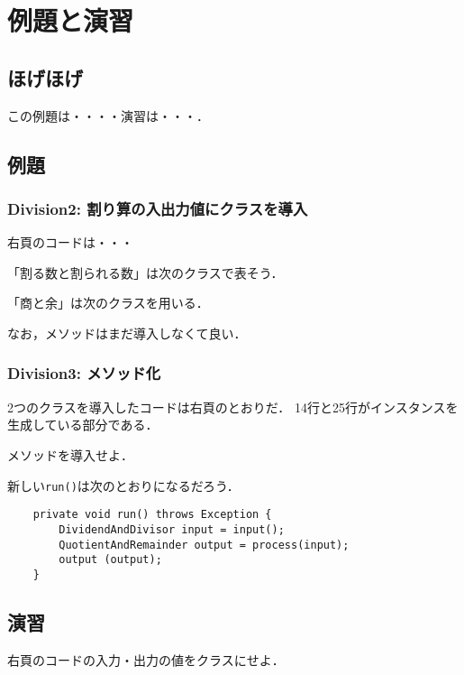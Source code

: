 \documentclass[a4j,papersize]{jsbook}
\begin{document}
\newpage
\chapter{例題と演習}
\section{ほげほげ}
この例題は・・・・演習は・・・．
\newpage
\section{例題}
\subsection{Division2: 割り算の入出力値にクラスを導入}

右頁のコードは・・・


「割る数と割られる数」は次のクラスで表そう．


「商と余」は次のクラスを用いる．


なお，メソッドはまだ導入しなくて良い．

\newpage

\newpage
\subsection{Division3: メソッド化}
2つのクラスを導入したコードは右頁のとおりだ．
14行と25行がインスタンスを生成している部分である．

\begin{例題}
 メソッドを導入せよ．
\end{例題}

新しい\texttt{run()}は次のとおりになるだろう．

\begin{verbatim}
	private void run() throws Exception {
	    DividendAndDivisor input = input();
	    QuotientAndRemainder output = process(input);
	    output (output);
	}
\end{verbatim}

\newpage

\newpage

\section{演習}
\begin{演習}
 右頁のコードの入力・出力の値をクラスにせよ．
\end{演習}
\end{document}
